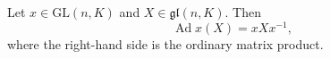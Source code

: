 Let $x \in \mathrm{GL}(n, K)$ and $X \in \mathfrak{gl}(n, K)$. Then
$$\operatorname{Ad} x (X) = x X x^{-1},$$
where the right-hand side is the ordinary matrix product.
